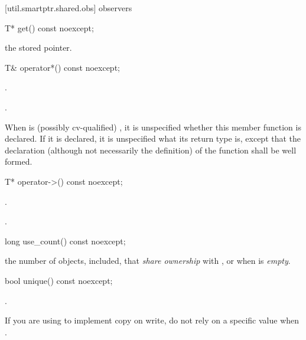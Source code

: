 [util.smartptr.shared.obs]{ observers}
%
\begin{itemdecl}
T* get() const noexcept;
\end{itemdecl}

\begin{itemdescr}
\pnum\returns  the stored pointer.
\end{itemdescr}

%
\begin{itemdecl}
T& operator*() const noexcept;
\end{itemdecl}

\begin{itemdescr}
\pnum\requires  {}.

\pnum\returns  {}.

\pnum\remarks When  is (possibly cv-qualified) ,
it is unspecified whether this
member function is declared. If it is declared, it is unspecified what its
return type is, except that the declaration (although not necessarily the
definition) of the function shall be well formed.
\end{itemdescr}

%
\begin{itemdecl}
T* operator->() const noexcept;
\end{itemdecl}

\begin{itemdescr}
\pnum\requires  {}.

\pnum\returns  {}.
\end{itemdescr}

%
\begin{itemdecl}
long use_count() const noexcept;
\end{itemdecl}

\begin{itemdescr}
\pnum\returns  the number of  objects,  included,
that \textit{share ownership} with , or  when  is
\textit{empty}.
\end{itemdescr}

%
\begin{itemdecl}
bool unique() const noexcept;
\end{itemdecl}

\begin{itemdescr}
\pnum\returns  {}.

\pnum \begin{note} If you are
using  to implement copy on write, do not rely on a
specific value when . \end{note}
\end{itemdescr}

